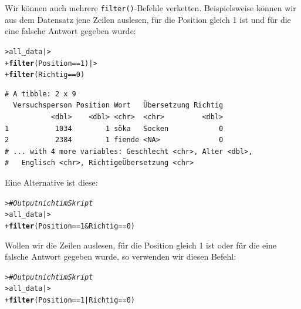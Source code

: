 \documentclass[oneside, 10pt]{book}\usepackage[]{graphicx}\usepackage[]{xcolor}
\makeatletter
\newcommand{\hlnum}[1]{\textcolor[rgb]{0.686,0.059,0.569}{#1}}%
\newcommand{\hlcom}[1]{\textcolor[rgb]{0.678,0.584,0.686}{\textit{#1}}}%
\newcommand{\hlopt}[1]{\textcolor[rgb]{0,0,0}{#1}}%
\newcommand{\hlstd}[1]{\textcolor[rgb]{0.345,0.345,0.345}{#1}}%
\newcommand{\hlkwd}[1]{\textcolor[rgb]{0.737,0.353,0.396}{\textbf{#1}}}%
\newenvironment{kframe}{%
 \def\at@end@of@kframe{}%
 \ifinner\ifhmode%
  \def\at@end@of@kframe{\end{minipage}}%
  \begin{minipage}{\columnwidth}%
 \fi\fi%
 \def\FrameCommand##1{\hskip\@totalleftmargin \hskip-\fboxsep
 \colorbox{shadecolor}{##1}\hskip-\fboxsep
     \hskip-\linewidth \hskip-\@totalleftmargin \hskip\columnwidth}%
 \MakeFramed {\advance\hsize-\width
   \@totalleftmargin\z@ \linewidth\hsize
   \@setminipage}}%
 {\par\unskip\endMakeFramed%
 \at@end@of@kframe}
\newenvironment{knitrout}{}{} %
\makeatother
\begin{document}
Wir können auch mehrere \texttt{filter()}-Befehle verketten.
Beispielsweise können wir aus dem Datensatz jene Zeilen auslesen,
für die Position gleich 1 ist und für die eine falsche Antwort gegeben wurde:
\begin{knitrout}
\color{fgcolor}\begin{kframe}
\begin{alltt}
\hlstd{> }\hlstd{all_data |>}
\hlstd{+ }  \hlkwd{filter}\hlstd{(Position} \hlopt{==} \hlnum{1}\hlstd{) |>}
\hlstd{+ }  \hlkwd{filter}\hlstd{(Richtig} \hlopt{==} \hlnum{0}\hlstd{)}
\end{alltt}
\begin{verbatim}
# A tibble: 2 x 9
  Versuchsperson Position Wort   Übersetzung Richtig
           <dbl>    <dbl> <chr>  <chr>         <dbl>
1           1034        1 söka   Socken            0
2           2384        1 fiende <NA>              0
# ... with 4 more variables: Geschlecht <chr>, Alter <dbl>,
#   Englisch <chr>, RichtigeÜbersetzung <chr>
\end{verbatim}
\end{kframe}
\end{knitrout}
Eine Alternative ist diese:
\begin{knitrout}
\color{fgcolor}\begin{kframe}
\begin{alltt}
\hlstd{> }\hlcom{# Output nicht im Skript}
\hlstd{> }\hlstd{all_data |>}
\hlstd{+ }  \hlkwd{filter}\hlstd{(Position} \hlopt{==} \hlnum{1} \hlopt{&} \hlstd{Richtig} \hlopt{==} \hlnum{0}\hlstd{)}
\end{alltt}
\end{kframe}
\end{knitrout}
Wollen wir die Zeilen auslesen, für die Position gleich 1 ist oder
für die eine falsche Antwort gegeben wurde, so verwenden wir diesen Befehl:
\begin{knitrout}
\color{fgcolor}\begin{kframe}
\begin{alltt}
\hlstd{> }\hlcom{# Output nicht im Skript}
\hlstd{> }\hlstd{all_data |>}
\hlstd{+ }  \hlkwd{filter}\hlstd{(Position} \hlopt{==} \hlnum{1} \hlopt{|} \hlstd{Richtig} \hlopt{==} \hlnum{0}\hlstd{)}
\end{alltt}
\end{kframe}
\end{knitrout}
\end{document}
